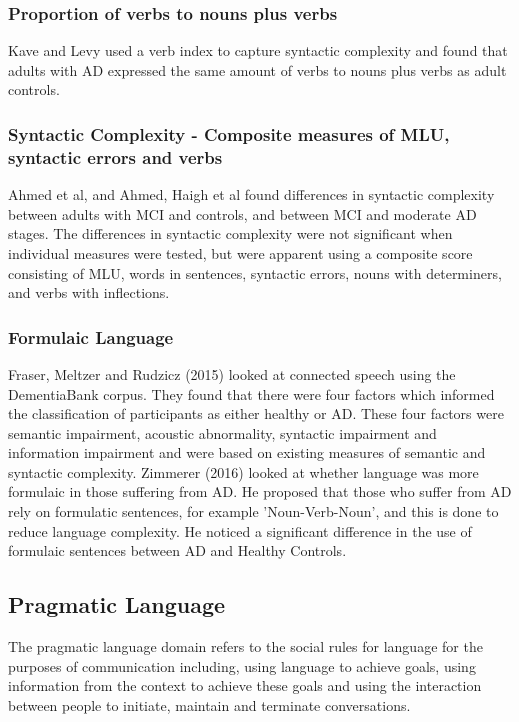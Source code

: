 \documentclass{article}
\begin{document}
\subsubsection{Proportion of verbs to nouns plus verbs}
Kave and Levy used a verb index to capture syntactic complexity and found that adults with AD expressed the same amount of verbs to nouns plus verbs as adult controls. \newline
\par
\subsubsection{Syntactic Complexity - Composite measures of MLU, syntactic errors and verbs}
Ahmed et al, and Ahmed, Haigh et al found differences in syntactic complexity between adults with MCI and controls, and between MCI and moderate AD stages. The differences in syntactic complexity were not significant when individual measures were tested, but were apparent using a composite score consisting of MLU, words in sentences, syntactic errors, nouns with determiners, and verbs with inflections. \newline
\par
\subsubsection{Formulaic Language}
Fraser, Meltzer and Rudzicz (2015) \cite{Fraser2015} looked at connected speech using the DementiaBank corpus. They found that there were four factors which informed the classification of participants as either healthy or AD. These four factors were semantic impairment, acoustic abnormality, syntactic impairment and information impairment and were based on existing measures of semantic and syntactic complexity. Zimmerer (2016) \cite{Zimmerer2016} looked at whether language was more formulaic in those suffering from AD. He proposed that those who suffer from AD rely on formulatic sentences, for example 'Noun-Verb-Noun', and this is done to reduce language complexity. He noticed a significant difference in the use of formulaic sentences between AD and Healthy Controls. \newline
\par
\subsection{Pragmatic Language}
The pragmatic language domain refers to the social rules for language for the purposes of communication including, using language to achieve goals, using information from the context to achieve these goals and using the interaction between people to initiate, maintain and terminate conversations.
\end{document}
